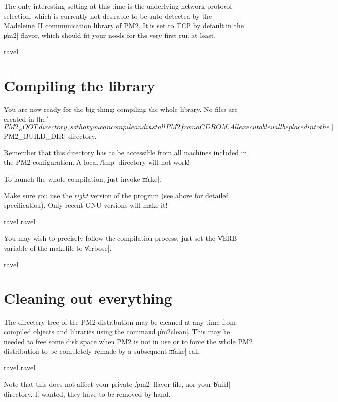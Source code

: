 The only interesting setting at this time is the underlying network
protocol selection, which is currently not desirable to be
auto-detected by the Madeleine~II communication library of PM2.  It is
set to TCP by default in the \|pm2| flavor, which should fit your
needs for the very first run at least. 
\begin{shell}
ravel%
\end{shell}

\section{Compiling the library}

You are now ready for the big thing: compiling the whole library.  No
files are created in the \|${PM2_ROOT}| directory, so that you can
compile and install PM2 from a CDROM. All executable will be placed
into the \|${PM2_BUILD_DIR}| directory. 

\begin{warning}
Remember that this directory
has to be accessible from all machines included in the PM2
configuration. A local \|/tmp| directory will not work!
\end{warning}

To launch the whole compilation, just invoke \|make|. 

\begin{warning}
Make sure you
use the \emph{right} version of the program (see above for detailed
specification). Only recent GNU versions will make it!
\end{warning}

\begin{shell}
ravel%
ravel%
\end{shell}
You may wish to precisely follow the compilation process, just set the
\|VERB| variable of the makefile to \|verbose|.
\begin{shell}
ravel%
\end{shell}

\section{Cleaning out everything}

The directory tree of the PM2 distribution may be cleaned at any time
from compiled objects and libraries using the command \|pm2clean|.
This may be needed to free some disk space when PM2 is not in use or
to force the whole PM2 distribution to be completely remade by a
subsequent \|make| call.
\begin{shell}
ravel%
ravel%
\end{shell}
Note that this does not affect your private \|.pm2| flavor file, nor
your \|build| directory. If wanted, they have to be removed by hand.

